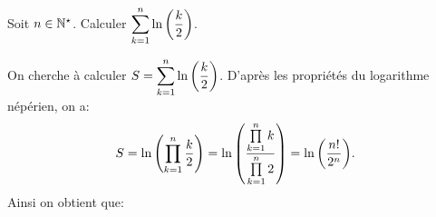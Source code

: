 \documentclass[a4paper, 11pt,reqno]{article}
\begin{document}
\begin{exercice} \; 
Soit $n\in\mathbb{N}^{\star}$. Calculer $\displaystyle \sum\limits_{k=1}^n \ln{\left( \displaystyle\frac{k}{2}  \right)}$.
\end{exercice}

\begin{correction}  \; 
On cherche \`{a} calculer $S=\displaystyle \sum\limits_{k=1}^n \ln{\left( \displaystyle\frac{k}{2}  \right)}$.  D'apr\`{e}s les propri\'et\'es du logarithme n\'ep\'erien, on a: 
$$S=\ln{\left( \displaystyle\prod\limits_{k=1}^n \frac{k}{2} \right)} = \ln{\left( \displaystyle\frac{\prod\limits_{k=1}^n k}{\prod\limits_{k=1}^n 2}  \right)} =  \ln{\left( \displaystyle\frac{n!}{2^n}\right)}.$$
Ainsi on obtient que: 
\end{correction}





\vspace{0.2cm}
\end{document}
